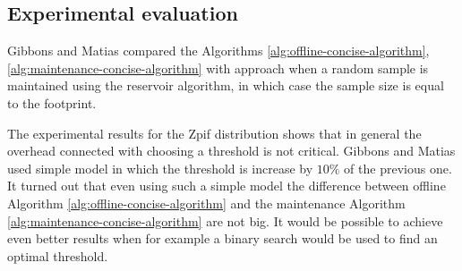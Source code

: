 \subsection{Experimental evaluation}
Gibbons and Matias \cite{GM98} compared the Algorithms
\ref{alg:offline-concise-algorithm}, \ref{alg:maintenance-concise-algorithm} with approach
when a random sample is maintained using the reservoir
algorithm, in which case the sample size is equal to the footprint.

The experimental results for the Zpif distribution shows that in
general the overhead connected with choosing a threshold is not
critical. Gibbons and Matias \cite{GM98} used simple model in which
the threshold is increase by $10\%$ of the previous one. It turned out
that even using such a simple model the difference between offline
Algorithm \ref{alg:offline-concise-algorithm} and the maintenance
Algorithm \ref{alg:maintenance-concise-algorithm} are not
big. It would be possible to achieve even better results when for
example a binary search would be used to find an optimal
threshold. 